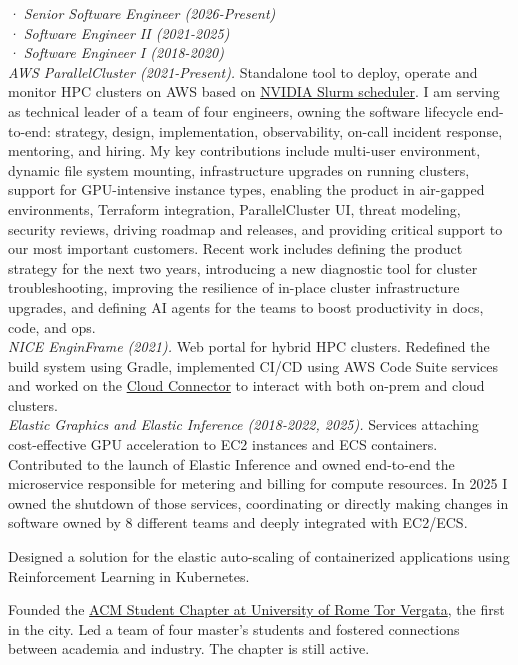 {{\color{secondary}\itshape · Senior Software Engineer (2026-Present)\\· Software Engineer II (2021-2025)\\· Software Engineer I (2018-2020)}\\
\textit{AWS ParallelCluster (2021-Present).} 
Standalone tool to deploy, operate and monitor HPC clusters on AWS based on \href{https://developer.nvidia.com/slurm}{NVIDIA Slurm scheduler}. 
I am serving as technical leader of a team of four engineers, owning the software lifecycle end-to-end: 
strategy, design, implementation, observability, on-call incident response, mentoring, and hiring. 
My key contributions include multi-user environment, dynamic file system mounting, infrastructure upgrades on running clusters, support for GPU-intensive instance types, 
enabling the product in air-gapped environments, Terraform integration, ParallelCluster UI, threat modeling, security reviews, 
driving roadmap and releases, and providing critical support to our most important customers.
Recent work includes defining the product strategy for the next two years, introducing a new diagnostic tool for cluster troubleshooting, 
improving the resilience of in-place cluster infrastructure upgrades, and defining AI agents for the teams to boost productivity in docs, code, and ops.\\
\textit{NICE EnginFrame (2021).} Web portal for hybrid HPC clusters. Redefined the build system using Gradle, implemented CI/CD using AWS Code Suite services 
and worked on the \href{https://aws.amazon.com/blogs/hpc/introducing-aws-hpc-connector/}{Cloud Connector} to interact with both on-prem and cloud clusters.\\
\textit{Elastic Graphics and Elastic Inference (2018-2022, 2025).} Services attaching cost-effective GPU acceleration to EC2 instances and ECS containers.
Contributed to the launch of Elastic Inference and owned end-to-end the microservice responsible for metering and billing for compute resources. 
In 2025 I owned the shutdown of those services, coordinating or directly making changes in software owned by 8 different teams and deeply integrated with EC2/ECS.}

{Designed a solution for the elastic auto-scaling of containerized applications using Reinforcement Learning in Kubernetes.}

{Founded the \href{https://acm.uniroma2.it/}{ACM Student Chapter at University of Rome Tor Vergata}, the first in the city. 
Led a team of four master's students and fostered connections between academia and industry.
The chapter is still active.}

